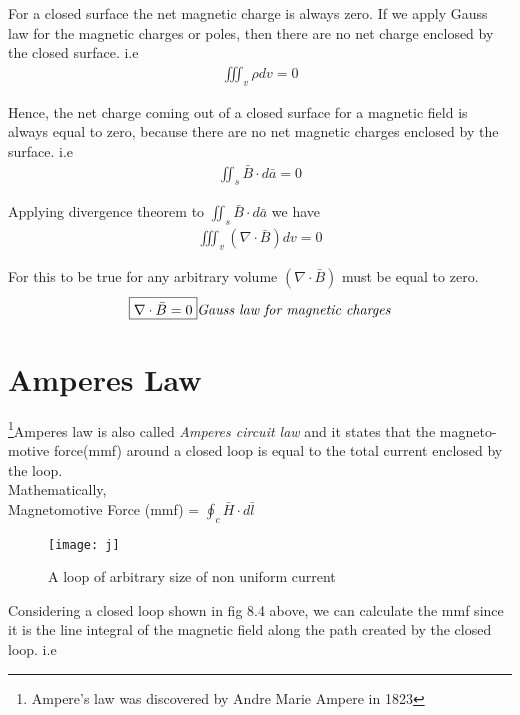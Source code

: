 For a closed surface the net magnetic charge is always zero. If we apply Gauss law for the magnetic charges or poles, then there are no net charge enclosed by the closed surface. i.e \\

\begin{align*}
\iiint_v\rho dv = 0
\end{align*}

Hence, the net charge coming out of a closed surface for a magnetic field is always equal to zero, because there are no net magnetic charges enclosed by the surface. i.e \\
\begin{align*}
\iint_s\bar{B}\cdot d\bar{a} = 0
\end{align*}

Applying divergence theorem to $\iint_s\bar{B}\cdot d\bar{a}$ we have\\
\begin{align*}
\iiint_v(\nabla \cdot \bar{B})dv = 0
\end{align*}	

For this to be true for any arbitrary volume $(\nabla \cdot \bar{B})$ must be equal to zero.\\
\begin{align}
\boxed{\nabla \cdot \bar{B} = 0}
\emph{Gauss law for magnetic charges}
\end{align}
\section{Amperes Law}
\footnote[7]{Ampere's law was discovered by Andre Marie Ampere in 1823 }Amperes law is also called \emph{Amperes circuit law} and it states that the magneto-motive force(mmf) around a closed loop is equal to the total current enclosed by the loop.\\
Mathematically, \\
Magnetomotive Force (mmf) = $\oint_c \bar{H} \cdot d\bar{l}$ \\

\begin{figure}
	\centering
	\texttt{[image: j]}
	\caption{A loop of arbitrary size of non uniform current}
	\label{fig:j}
\end{figure}


Considering a closed loop shown in fig 8.4 above, we can calculate the mmf since it is the line integral of the magnetic field along the path created by the closed loop. i.e \\

